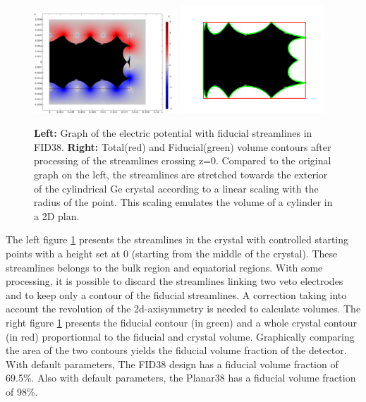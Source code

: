 \begin{figure}
\centering
\includegraphics[width=0.48\textwidth]{Figures/Electrodes/fid38_fiducial_streamlines.png}
\includegraphics[width=0.48\textwidth]{Figures/Electrodes/fid38_fiducial_contour.png}
\caption{
\textbf{Left:} Graph of the electric potential with fiducial streamlines in FID38.
\textbf{Right:} Total(red) and Fiducial(green) volume contours after processing of the streamlines crossing z=0. Compared to the original graph on the left, the streamlines are stretched towards the exterior of the cylindrical Ge crystal according to a linear scaling with the radius of the point. This scaling emulates the volume of a cylinder in a 2D plan.
}
\label{fig:fid38-fiducial}
\end{figure}

\label{par:fiducial-volume}

The left figure \ref{fig:fid38-fiducial} presents the streamlines in the crystal with controlled starting points with a height set at 0 (starting from the middle of the crystal). These streamlines belongs to the bulk region and equatorial regions. With some processing, it is possible to discard the streamlines linking two veto electrodes and to keep only a contour of the fiducial streamlines. A correction taking into account the revolution of the 2d-axisymmetry is needed to calculate volumes. The right figure \ref{fig:fid38-fiducial} presents the fiducial contour (in green) and a whole crystal contour (in red) proportionnal to the fiducial and crystal volume. Graphically comparing the area of the two contours yields the fiducial volume fraction of the detector. With default parameters, The FID38 design has a fiducial volume fraction of 69.5\%. Also with default parameters, the Planar38 has a fiducial volume fraction of 98\%.


